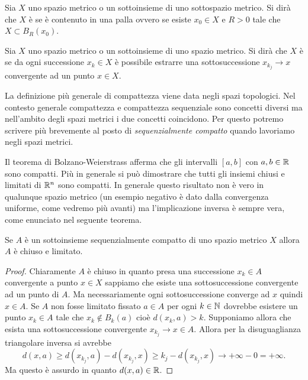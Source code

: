 \begin{definition}
\mymark{*}
Sia $X$ uno spazio metrico o un sottoinsieme di uno sottospazio metrico. Si dirà che $X$ è
 se è contenuto in una palla ovvero se
esiste $x_0\in X$ e $R>0$ tale che $X\subset B_R(x_0)$.
\end{definition}

\begin{definition}
\mymark{**}
Sia $X$ uno spazio metrico o un sottoinsieme di uno
spazio metrico. Si dirà che $X$ è
 se da ogni
successione $x_k \in X$ è possibile estrarre una sottosuccessione $x_{k_j}\to x$
convergente ad un punto $x\in X$.
\end{definition}

La definizione più generale di compattezza viene data negli spazi topologici.
Nel contesto generale compattezza e compattezza sequenziale sono concetti
diversi ma nell'ambito degli spazi metrici i due concetti coincidono.
Per questo potremo scrivere più brevemente 
al posto di \emph{sequenzialmente compatto} quando lavoriamo negli spazi metrici.

Il teorema di Bolzano-Weierstrass afferma che gli intervalli $[a,b]$ con
$a,b\in \mathbb R$ sono compatti.
Più in generale si può dimostrare che tutti gli insiemi chiusi e limitati
di $\mathbb R^n$ sono compatti. In generale questo risultato non è vero in qualunque
spazio metrico (un esempio negativo è dato dalla convergenza uniforme, come
vedremo più avanti) ma l'implicazione inversa è sempre vera, come enunciato nel
seguente teorema.

\begin{theorem}
\mymark{**}
Se $A$ è un sottoinsieme sequenzialmente
compatto di uno spazio metrico $X$
allora $A$ è chiuso e limitato.
\end{theorem}
%
\begin{proof}
Chiaramente $A$ è chiuso in quanto presa una successione $x_k\in A$ convergente a punto $x\in X$
sappiamo che esiste una sottosuccessione convergente ad un punto di $A$. Ma necessariamente ogni sottosuccessione converge ad $x$ quindi $x\in A$. Se $A$ non fosse limitato
fissato $a\in A$ per ogni $k\in \mathbb N$ dovrebbe esistere un punto $x_k\in A$ tale che $x_k \not\in B_k(a)$
cioè $d(x_k,a) > k$. Supponiamo allora che esista una sottosuccessione convergente $x_{k_j}\to x \in A$. Allora per la disuguaglianza triangolare inversa si avrebbe
\[
  d(x, a) \ge d(x_{k_j}, a) - d(x_{k_j},x)
   \ge k_j - d(x_{k_j},x) \to +\infty - 0 = +\infty.
\]
Ma questo è assurdo in quanto $d(x,a)\in \mathbb R$.
\end{proof}

